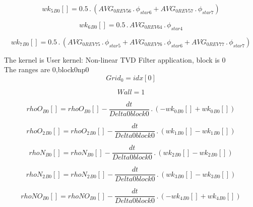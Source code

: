\documentclass{article}
\begin{document}
\begin{dmath}{wk_{5}{_{B0}}}[{}] = 0.5 \,.\, \left(AVG_{0 REV 56} \,.\, \phi_{star 6} + AVG_{0 REV 57} \,.\, \phi_{star 7}\right)\end{dmath}

\begin{dmath}{wk_{6}{_{B0}}}[{}] = 0.5 \,.\, AVG_{0 REV 64} \,.\, \phi_{star 4}\end{dmath}

\begin{dmath}{wk_{7}{_{B0}}}[{}] = 0.5 \,.\, \left(AVG_{0 REV 75} \,.\, \phi_{star 5} + AVG_{0 REV 76} \,.\, \phi_{star 6} + AVG_{0 REV 77} \,.\, \phi_{star 7}\right)\end{dmath}

\noindent The kernel is User kernel: Non-linear TVD Filter application, block is 0\\\noindent The ranges are 0,block0np0\\\begin{dmath}Grid_{0} = {idx}[{0}]\end{dmath}

\begin{dmath}Wall = 1\end{dmath}

\begin{dmath}{rhoO{_{B0}}}[{}] = {rhoO{_{B0}}}[{}] - \frac{dt}{Delta0block0} \,.\, \left(- {wk_{0}{_{B0}}}[{}] + {wk_{0}{_{B0}}}[{}]\right)\end{dmath}

\begin{dmath}{rhoO_{2}{_{B0}}}[{}] = {rhoO_{2}{_{B0}}}[{}] - \frac{dt}{Delta0block0} \,.\, \left({wk_{1}{_{B0}}}[{}] - {wk_{1}{_{B0}}}[{}]\right)\end{dmath}

\begin{dmath}{rhoN{_{B0}}}[{}] = {rhoN{_{B0}}}[{}] - \frac{dt}{Delta0block0} \,.\, \left({wk_{2}{_{B0}}}[{}] - {wk_{2}{_{B0}}}[{}]\right)\end{dmath}

\begin{dmath}{rhoN_{2}{_{B0}}}[{}] = {rhoN_{2}{_{B0}}}[{}] - \frac{dt}{Delta0block0} \,.\, \left({wk_{3}{_{B0}}}[{}] - {wk_{3}{_{B0}}}[{}]\right)\end{dmath}

\begin{dmath}{rhoNO{_{B0}}}[{}] = {rhoNO{_{B0}}}[{}] - \frac{dt}{Delta0block0} \,.\, \left(- {wk_{4}{_{B0}}}[{}] + {wk_{4}{_{B0}}}[{}]\right)\end{dmath}
\end{document}
